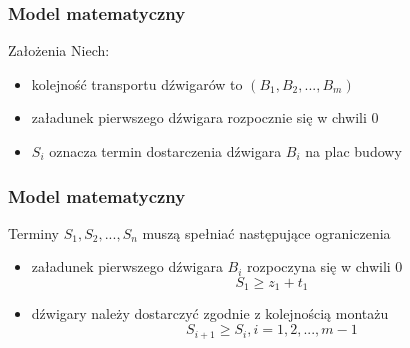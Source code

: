 \documentclass{beamer}
\begin{document}
 \begin{frame}
 \frametitle{Model matematyczny}
 
 \begin{block}{Założenia}
 Niech:
 \begin{itemize}
  \item kolejność transportu dźwigarów to $(B_1, B_2,...,B_m) $
  \item załadunek pierwszego dźwigara rozpocznie się w chwili 0
  \item $ S_i $ oznacza termin dostarczenia dźwigara $B_i$ na plac budowy 
 \end{itemize}
 \end{block}
\end{frame}

 \begin{frame}
 \frametitle{Model matematyczny}
 
 \begin{block}{Terminy $S_1, S_2,...,S_n $ muszą spełniać następujące ograniczenia}
 \begin{itemize}
    \item załadunek pierwszego dźwigara $B_i$ rozpoczyna się w chwili 0
    \begin{equation}\label{eq:ZeroStart}
     S_1 \ge z_1 + t_1 
    \end{equation}
    \item dźwigary należy dostarczyć zgodnie z kolejnością montażu 
    \begin{equation}\label{eq:Order}
     S_{i+1} \ge S_i , i = 1,2,...,m-1
    \end{equation}    
 \end{itemize}
 \end{block}
\end{frame}
\end{document}

